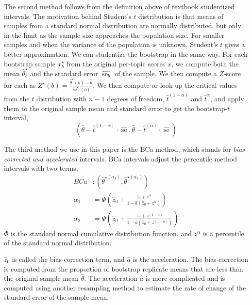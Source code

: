 \documentclass{sig-alt-release-2013}
\DeclareMathOperator{\se}{se}
\begin{document}
The second method follows from the definition above of textbook studentized intervals.  The motivation behind Student's $t$ distribution is that means of samples from a standard normal distribution are normally distributed, but only in the limit as the sample size approaches the population size.  For smaller samples and when the variance of the population is unknown, Student's $t$ gives a better approximation.  We can studentize the bootstrap in the same way.  For each bootstrap sample $x^\star_b$ from the original per-topic scores $x$, we compute both the mean $\hat{\theta}^\star_b$ and the standard error $\hat{\se}^\star_b$ of the sample.  We then compute a $Z$-score for each as
$Z^\star(b) = \frac{\hat{\theta}^\star(b) - \hat{\theta}}{\hat{\se}^\star(b)}$.
We then compute or look up the critical values from the $t$ distribution with $n - 1$ degrees of freedom, $\hat{t}^{(1-\alpha)}$ and $\hat{t}^\alpha$, and apply them to the original sample mean and standard error to get the bootstrap-$t$ interval,
\[ (\hat{\theta} - \hat{t}^{(1-\alpha)} \cdot \hat{\se}, \hat{\theta} - \hat{t}^{(\alpha)} \cdot \hat{\se}) \]

The third method we use in this paper is the BCa method, which stands for {\em bias-corrected and accelerated} intervals.  BCa intervals adjust the percentile method intervals with two terms,
\begin{align*}
BCa & : (\hat{\theta}^{\star(\alpha_1)}, \hat{\theta}^{\star(\alpha_2)}) \\
\alpha_1 & = \Phi(\hat{z}_0 + \frac{\hat{z}_0 + z^\alpha}{1 - \hat{a}(\hat{z}_0 + z^\alpha)}) \\
\alpha_2 & = \Phi(\hat{z}_0 + \frac{\hat{z}_0 + z^{(1-\alpha)}}{1 - \hat{a}(\hat{z}_0 + z^{(1-\alpha)})})
\end{align*}
$\Phi$ is the standard normal cumulative distribution function, and $z^\alpha$ is a percentile of the standard normal distribution.  

$\hat{z}_0$ is called the bias-correction term, and $\hat{a}$ is the acceleration.  The bias-correction is computed from the proportion of bootstrap replicate means that are less than the original sample mean $\hat{\theta}$.  The acceleration $\hat{a}$ is more complicated and is computed using another resampling method to estimate the rate of change of the standard error of the sample mean.
\end{document}
